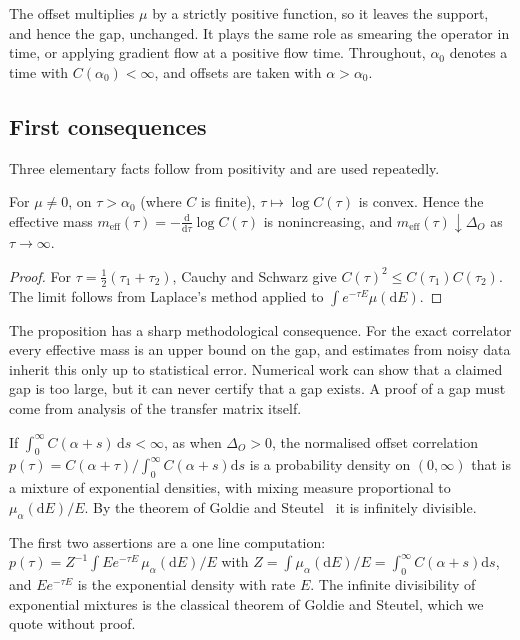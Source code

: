 The offset multiplies $\mu$ by a strictly positive function, so it leaves the support, and hence the gap, unchanged. It plays the same role as smearing the operator in time, or applying gradient flow at a positive flow time. Throughout, $\alpha_0$ denotes a time with $C(\alpha_0)<\infty$, and offsets are taken with $\alpha>\alpha_0$.

\subsection{First consequences}\label{sec:first}

Three elementary facts follow from positivity and are used repeatedly.

\begin{proposition}\label{prop:logconvex}
For $\mu\ne0$, on $\tau>\alpha_0$ (where $C$ is finite), $\tau\mapsto\log C(\tau)$ is convex. Hence the effective mass $m_{\mathrm{eff}}(\tau)=-\frac{\mathrm d}{\mathrm d\tau}\log C(\tau)$ is nonincreasing, and $m_{\mathrm{eff}}(\tau)\downarrow\Delta_O$ as $\tau\to\infty$.
\end{proposition}

\begin{proof}
For $\tau=\frac12(\tau_1+\tau_2)$, Cauchy and Schwarz give $C(\tau)^2\le C(\tau_1)C(\tau_2)$. The limit follows from Laplace's method applied to $\int e^{-\tau E}\mu(\mathrm dE)$.
\end{proof}

The proposition has a sharp methodological consequence. For the exact correlator every effective mass is an upper bound on the gap, and estimates from noisy data inherit this only up to statistical error. Numerical work can show that a claimed gap is too large, but it can never certify that a gap exists. A proof of a gap must come from analysis of the transfer matrix itself.

\begin{proposition}\label{prop:mixexp}
If $\int_0^\infty C(\alpha+s)\,\mathrm ds<\infty$, as when $\Delta_O>0$, the normalised offset correlation $p(\tau)=C(\alpha+\tau)/\int_0^\infty C(\alpha+s)\mathrm ds$ is a probability density on $(0,\infty)$ that is a mixture of exponential densities, with mixing measure proportional to $\mu_\alpha(\mathrm dE)/E$. By the theorem of Goldie and Steutel~\cite{Go67,St67} it is infinitely divisible.
\end{proposition}

The first two assertions are a one line computation: $p(\tau)=Z^{-1}\int Ee^{-\tau E}\,\mu_\alpha(\mathrm dE)/E$ with $Z=\int\mu_\alpha(\mathrm dE)/E=\int_0^\infty C(\alpha+s)\mathrm ds$, and $Ee^{-\tau E}$ is the exponential density with rate $E$. The infinite divisibility of exponential mixtures is the classical theorem of Goldie and Steutel, which we quote without proof.

